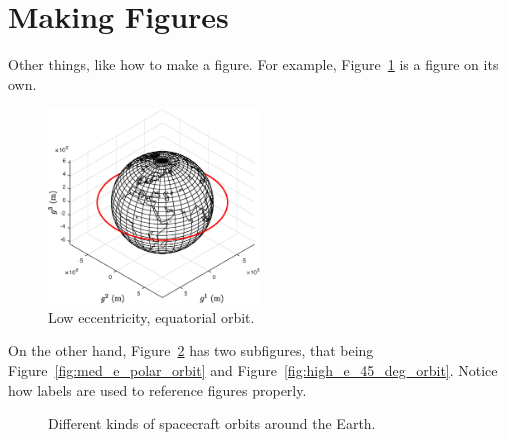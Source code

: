 \documentclass[11pt]{article}
\begin{document}
\newpage
\section{Making Figures}

Other things, like how to make a figure. For example, Figure~\ref{fig:low_e_equatorial_orbit} is a figure on its own. 

\begin{figure}[ht]
	\centering
        		\includegraphics[width=0.5\textwidth]{figs/low_e_equatorial_orbit.eps}
    	\caption{Low eccentricity, equatorial orbit.}
    	\label{fig:low_e_equatorial_orbit}
\end{figure}

On the other hand, Figure~\ref{fig:orbits} has two subfigures, that being Figure~\ref{fig:med_e_polar_orbit} and Figure~\ref{fig:high_e_45_deg_orbit}. Notice how labels are used to reference figures properly. 
\begin{figure}[ht!]
  \centering
	\caption{Different kinds of spacecraft orbits around the Earth.}
  \label{fig:orbits}
\end{figure}




\newpage



\end{document}
